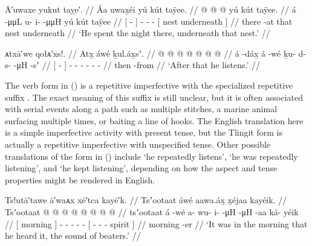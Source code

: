 
\ex\label{ex:91-52-spend-night-underneath}%
%
\begingl
	\glpreamble	Ā′uwaxe yukut taỵe′. //
	\glpreamble	Áa uwax̱éi yú kút taÿee. //
	\gla	{}  {} {}
		 @ {} @ {} @ {}
		{} yú kút taÿee. {} //
	\glb	{} á -μμL {}
		u- i-  -μμH
		{} yú kút taÿee {} //
	\glc	{}[  - {}]
		- -  -
		{}[  nest underneath {}] //
	\gld	{} there -at {}
		 {} {} {}
		{} that nest underneath {} //
	\glft	‘He spent the night there, underneath that nest.’
		//
\endgl
\xe

\ex\label{ex:91-53-after-listens}%
%
\begingl
	\glpreamble	ᴀtxā′we qołᴀ′xs!. //
	\glpreamble	Atx̱ áwé ḵul.áx̱sʼ. //
	\gla	{}  @ {} {}  @ {}
		 @ {} @ {} @ {} @ {} @ {} //
	\glb	{} á -dáx̱ {} á -wé
		ḵu- d- s-  -μH -sʼ //
	\glc	{}[  - {}]  -
		- - -  - - //
	\gld	{} then -from {}  {}
		 {} {} {} {} {} //
	\glft	‘After that he listens.’
		//
\endgl
\xe

The verb form  in (\lastx) is a repetitive imperfective with the specialized repetitive suffix .
The exact meaning of this suffix is still unclear, but it is often associated with serial events along a path such as multiple stitches, a marine animal surfacing multiple times, or baiting a line of hooks.
The English translation here is a simple imperfective activity with present tense, but the Tlingit form is actually a repetitive imperfective with unspecified tense.
Other possible translations of the form in (\lastx) include ‘he repeatedly listens’, ‘he was repeatedly listening’, and ‘he kept listening’, depending on how the aspect and tense properties might be rendered in English.

\ex\label{ex:91-54-morning-heard-sound-of-beaters}%
%
\begingl
	\glpreamble	Ts!utā′tawe ā′waᴀx xē′tca kayē′k. //
	\glpreamble	Tsʼootaat áwé aawa.áx̱ x̱éjaa kayéik. //
	\gla	{} Tsʼootaat {}  @ {}
		 @ {} @ {} @ {} @ {}
		{}  @ {} @ {}  @ {} {} //
	\glb	{} tsʼootaat {} á -wé
		a- wu- i-  -μH
		{}  -μH -aa ká- yéik {} //
	\glc	{}[ morning {}]  -
		- - -  -
		{}[  - - - spirit {}] //
	\gld	{} morning {}  {}
		 {} {} {} {}
		{}  {} -er  {} {} //
	\glft	‘It was in the morning that he heard it, the sound of beaters.’
		//
\endgl
\xe

